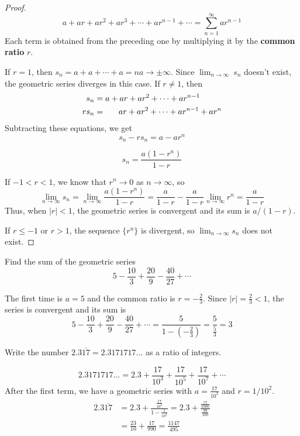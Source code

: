   \begin{proof}\let\qed\relax
    $$a + ar + ar^2 + ar^3 + \cdots + ar^{n-1} + \cdots = \sum_{n=1}^{\infty}ar^{n-1}$$
    Each term is obtained from the preceding one by multiplying it by the \textbf{common ratio} $r$.\par
    If $r=1$, then $s_n = a+a+\cdots+a=na \to \pm\infty$. Since $\lim_{n\to\infty}\ s_n$ doesn't exist, the geometric series diverges in this case.
    If $r \neq 1$, then
    \begin{align*}
      s_n &= a + ar + ar^2 + \cdots + ar^{n-1} \\
      rs_n &= \hphantom{a +\ } ar + ar^2 + \cdots + ar^{n-1} + ar^n
    \end{align*}
    Subtracting these equations, we get
    $$s_n-rs_n = a-ar^n$$
      \begin{definition}
        $$s_n = \frac{a(1-r^n)}{1-r}$$
      \end{definition}
      If $-1<r<1$, we know that $r^n \to 0$ as $n\to\infty$, so
      $$\lim_{n\to\infty}s_n =\lim_{n\to\infty}\frac{a(1-r^n)}{1-r} = \frac{a}{1-r}-\frac{a}{1-r}\lim_{n\to\infty}r^n = \frac{a}{1-r}$$
      Thus, when $|r|<1$, the geometric series is convergent and its sum is $a/(1-r)$.\par
      If $r\leq -1$ or $r >1$, the sequence $\{r^n\}$ is divergent, so $\lim_{n\to\infty}s_n$ does not exist.
  \end{proof}
  \begin{example}
    Find the sum of the geometric series $$5-\frac{10}{3}+\frac{20}{9}-\frac{40}{27}+\cdots$$
  \end{example}
  \begin{solution}
    The first time is $a=5$ and the common ratio is $r=-\frac{2}{3}$. Since $|r|=\frac{2}{3}<1$, the series is convergent and its sum is
    $$5-\frac{10}{3}+\frac{20}{9}-\frac{40}{27}+\cdots = \frac{5}{1-(-\frac{2}{3})} = \frac{5}{\frac{5}{3}} = 3$$
  \end{solution}
  \begin{example}
    Write the number $2.3\overline{17} = 2.3171717 \ldots$ as a ratio of integers.
  \end{example}
  \begin{solution}
    $$ 2.3171717 \ldots = 2.3 + \frac{17}{10^3} + \frac{17}{10^5} + \frac{17}{10^7} + \cdots$$
    After the first term, we have a geometric series with $a=\frac{17}{10^3}$ and $r=1/10^2$.
    \begin{align*}
      2.3\overline{17} &= 2.3 + \frac{\frac{17}{10^3}}{1-\frac{1}{10^2}} = 2.3 + \frac{\frac{17}{1000}}{\frac{99}{100}} \\
      &= \frac{23}{10} + \frac{17}{990} = \frac{1147}{495}
    \end{align*}
  \end{solution}
